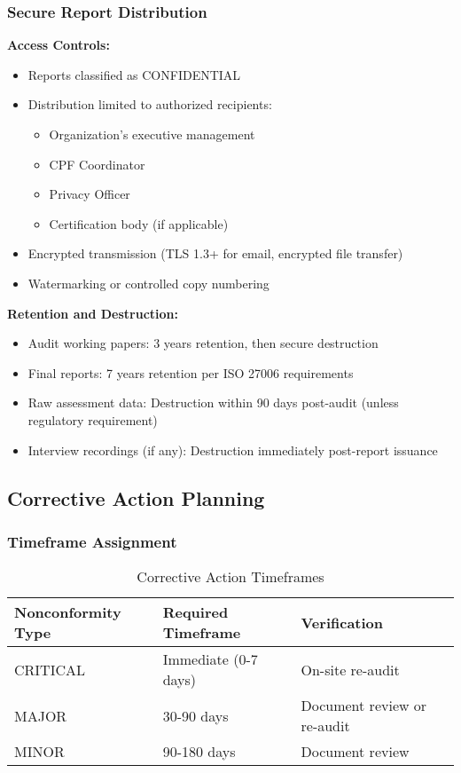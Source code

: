 \documentclass[11pt,a4paper]{article}
\begin{document}
\subsubsection{Secure Report Distribution}

\textbf{Access Controls:}

\begin{itemize}
\item Reports classified as CONFIDENTIAL
\item Distribution limited to authorized recipients:
  \begin{itemize}
  \item Organization's executive management
  \item CPF Coordinator
  \item Privacy Officer
  \item Certification body (if applicable)
  \end{itemize}
\item Encrypted transmission (TLS 1.3+ for email, encrypted file transfer)
\item Watermarking or controlled copy numbering
\end{itemize}

\textbf{Retention and Destruction:}

\begin{itemize}
\item Audit working papers: 3 years retention, then secure destruction
\item Final reports: 7 years retention per ISO 27006 requirements
\item Raw assessment data: Destruction within 90 days post-audit (unless regulatory requirement)
\item Interview recordings (if any): Destruction immediately post-report issuance
\end{itemize}

\subsection{Corrective Action Planning}

\subsubsection{Timeframe Assignment}

\begin{table}[h]
\centering
\caption{Corrective Action Timeframes}
\begin{tabular}{lll}
\toprule
\textbf{Nonconformity Type} & \textbf{Required Timeframe} & \textbf{Verification} \\
\midrule
CRITICAL & Immediate (0-7 days) & On-site re-audit \\
MAJOR & 30-90 days & Document review or re-audit \\
MINOR & 90-180 days & Document review \\
\bottomrule
\end{tabular}
\end{table}
\end{document}
